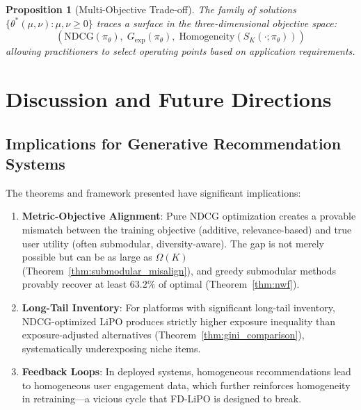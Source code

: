 \documentclass[11pt,a4paper]{article}
\theoremstyle{definition}
\theoremstyle{plain}
\newtheorem{proposition}[theorem]{Proposition}
\theoremstyle{remark}
\newcommand{\NDCG}{\mathrm{NDCG}}
\begin{document}
\begin{proposition}[Multi-Objective Trade-off]
\label{prop:pareto}
The family of solutions $\{\theta^*(\mu, \nu) : \mu, \nu \geq 0\}$ traces a surface in the three-dimensional objective space:
\begin{equation}
    (\NDCG(\pi_\theta), \; G_{\text{exp}}(\pi_\theta), \; \text{Homogeneity}(S_K(\cdot; \pi_\theta)))
\end{equation}
allowing practitioners to select operating points based on application requirements.
\end{proposition}

\section{Discussion and Future Directions}
\label{sec:discussion}

\subsection{Implications for Generative Recommendation Systems}
\label{subsec:implications}

The theorems and framework presented have significant implications:

\begin{enumerate}[label=\textbf{I.\arabic*}]
    \item \textbf{Metric-Objective Alignment}: Pure NDCG optimization creates a provable mismatch between the training objective (additive, relevance-based) and true user utility (often submodular, diversity-aware). The gap is not merely possible but can be as large as $\Omega(K)$ (Theorem~\ref{thm:submodular_misalign}), and greedy submodular methods provably recover at least $63.2\%$ of optimal (Theorem~\ref{thm:nwf}).
    
    \item \textbf{Long-Tail Inventory}: For platforms with significant long-tail inventory, NDCG-optimized LiPO produces strictly higher exposure inequality than exposure-adjusted alternatives (Theorem~\ref{thm:gini_comparison}), systematically underexposing niche items.
    
    \item \textbf{Feedback Loops}: In deployed systems, homogeneous recommendations lead to homogeneous user engagement data, which further reinforces homogeneity in retraining---a vicious cycle that FD-LiPO is designed to break.
\end{enumerate}
\end{document}
